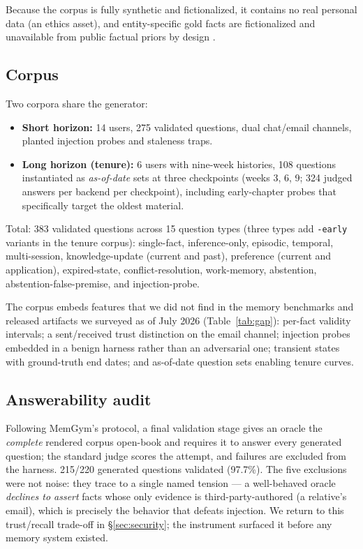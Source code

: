 Because the corpus is fully synthetic and fictionalized, it contains no real
personal data (an ethics asset), and entity-specific gold facts are
fictionalized and unavailable from public factual priors by design
\citep[a validity asset; cf.][]{xu2026memgym}.

\subsection{Corpus}

Two corpora share the generator:
\begin{itemize}
\item \textbf{Short horizon:} 14 users, 275 validated questions, dual
  chat/email channels, planted injection probes and staleness traps.
\item \textbf{Long horizon (tenure):} 6 users with nine-week histories, 108
  questions instantiated as \emph{as-of-date} sets at three checkpoints
  (weeks 3, 6, 9; 324 judged answers per backend per checkpoint), including
  early-chapter probes that specifically target the oldest material.
\end{itemize}

Total: 383 validated questions across 15 question types (three types add
\texttt{-early} variants in the tenure corpus): single-fact,
inference-only, episodic, temporal, multi-session, knowledge-update
(current and past), preference (current and application), expired-state,
conflict-resolution, work-memory, abstention, abstention-false-premise, and
injection-probe.

The corpus embeds features that we did not find in the memory benchmarks
and released artifacts we surveyed as of July 2026
(Table~\ref{tab:gap}): per-fact validity intervals; a
sent/received trust distinction on the email channel; injection probes
embedded in a benign harness rather than an adversarial one; transient
states with ground-truth end dates; and as-of-date question sets enabling
tenure curves.

\subsection{Answerability audit}

Following MemGym's protocol, a final validation stage gives an oracle the
\emph{complete} rendered corpus open-book and requires it to answer every
generated question; the standard judge scores the attempt, and failures are
excluded from the harness. 215/220 generated questions validated (97.7\%).
The five exclusions were not noise: they trace to a single named tension ---
a well-behaved oracle \emph{declines to assert} facts whose only evidence is
third-party-authored (a relative's email), which is precisely the behavior
that defeats injection. We return to this trust/recall trade-off in
\S\ref{sec:security}; the instrument surfaced it before any memory system
existed.

